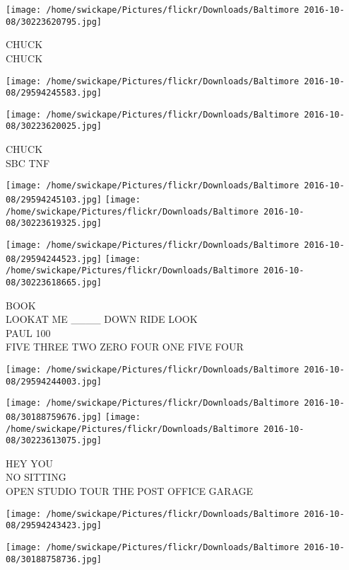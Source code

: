 \documentclass[10pt,letterpaper]{article}
\begin{document}
\vspace{0.25in}
\texttt{[image: /home/swickape/Pictures/flickr/Downloads/Baltimore 2016-10-08/30223620795.jpg]}

CHUCK\\
CHUCK
\pagebreak

\texttt{[image: /home/swickape/Pictures/flickr/Downloads/Baltimore 2016-10-08/29594245583.jpg]}

\vspace{0.25in}
\texttt{[image: /home/swickape/Pictures/flickr/Downloads/Baltimore 2016-10-08/30223620025.jpg]}

CHUCK\\
SBC TNF
\pagebreak

\texttt{[image: /home/swickape/Pictures/flickr/Downloads/Baltimore 2016-10-08/29594245103.jpg]}
\texttt{[image: /home/swickape/Pictures/flickr/Downloads/Baltimore 2016-10-08/30223619325.jpg]}

\texttt{[image: /home/swickape/Pictures/flickr/Downloads/Baltimore 2016-10-08/29594244523.jpg]}
\texttt{[image: /home/swickape/Pictures/flickr/Downloads/Baltimore 2016-10-08/30223618665.jpg]}

BOOK\\
LOOKAT ME \_\_\_\_ DOWN RIDE LOOK\\
PAUL 100\\
FIVE THREE TWO ZERO FOUR ONE FIVE FOUR
\pagebreak

\texttt{[image: /home/swickape/Pictures/flickr/Downloads/Baltimore 2016-10-08/29594244003.jpg]}

\vspace{0.25in}
\texttt{[image: /home/swickape/Pictures/flickr/Downloads/Baltimore 2016-10-08/30188759676.jpg]}
\texttt{[image: /home/swickape/Pictures/flickr/Downloads/Baltimore 2016-10-08/30223613075.jpg]}

HEY YOU\\
NO SITTING\\
OPEN STUDIO TOUR THE POST OFFICE GARAGE
\pagebreak

\texttt{[image: /home/swickape/Pictures/flickr/Downloads/Baltimore 2016-10-08/29594243423.jpg]}

\vspace{0.25in}
\texttt{[image: /home/swickape/Pictures/flickr/Downloads/Baltimore 2016-10-08/30188758736.jpg]}
\end{document}
